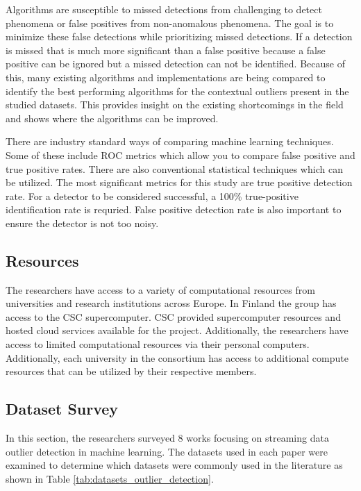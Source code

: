 Algorithms are susceptible to missed detections from challenging to detect phenomena or false positives from non-anomalous phenomena. The goal is to minimize these false detections while prioritizing missed detections. If a detection is missed that is much more significant than a false positive because a false positive can be ignored but a missed detection can not be identified. Because of this, many existing algorithms and implementations are being compared to identify the best performing algorithms for the contextual outliers present in the studied datasets. This provides insight on the existing shortcomings in the field and shows where the algorithms can be improved.

There are industry standard ways of comparing machine learning techniques. Some of these include ROC metrics which allow you to compare false positive and true positive rates. There are also conventional statistical techniques which can be utilized. The most significant metrics for this study are true positive detection rate. For a detector to be considered successful, a 100\% true-positive identification rate is requried. False positive detection rate is also important to ensure the detector is not too noisy.

\subsection{Resources}

The researchers have access to a variety of computational resources from universities and research institutions across Europe. In Finland the group has access to the CSC supercomputer. CSC provided supercomputer resources and hosted cloud services available for the project. Additionally, the researchers have access to limited computational resources via their personal computers. Additionally, each university in the consortium has access to additional compute resources that can be utilized by their respective members.

\subsection{Dataset Survey}
\label{ref_dataset_survey}

In this section, the researchers surveyed 8 works focusing on streaming data outlier detection in machine learning. The datasets used in each paper were examined to determine which datasets were commonly used in the literature as shown in Table \ref{tab:datasets_outlier_detection}.


